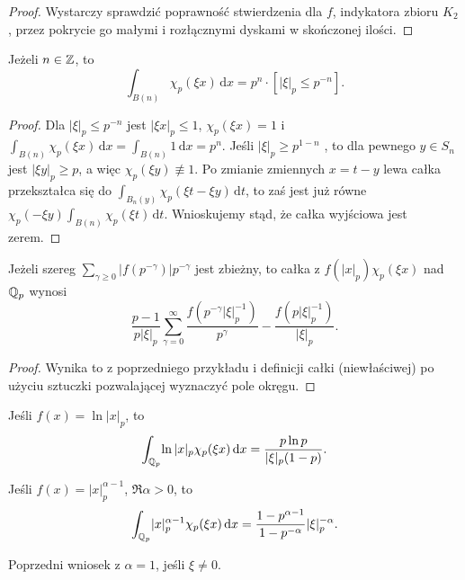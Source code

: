 \begin{proof}
	Wystarczy sprawdzić poprawność stwierdzenia dla $f$, indykatora zbioru $K_2$, przez pokrycie go małymi i rozłącznymi dyskami w skończonej ilości.
\end{proof}

\begin{przyklad}
	Jeżeli  $n \in \mathbb Z$, to
	\[
		\int_{B(n)}\! \chi_p(\xi x) \,\textrm{d}x = p^n \cdot [|\xi|_p \le p^{-n}].
	\]
\end{przyklad}

\begin{proof}
	Dla $|\xi|_p \le p^{-n}$ jest $|\xi x|_p \le 1$, $\chi_p(\xi x) = 1$ i $\int_{B(n)} \chi_p(\xi x)\,\textrm{d}x = \int_{B(n)} 1 \,\textrm{d}x = p^n$.
	Jeśli $|\xi|_p \ge p^{1-n}$	, to dla pewnego $y \in S_n$ jest $|\xi y|_p \ge p$, a więc $\chi_p(\xi y) \not \equiv 1$.
	Po zmianie zmiennych $x = t - y$ lewa całka przekształca się do
	$\int_{B_n(y)} \chi_p(\xi t - \xi y)\,\textrm{d} t$, to zaś jest już równe $\chi_p(- \xi y) \int_{B(n)} \chi_p(\xi t) \,\textrm{d} t$.
	Wnioskujemy stąd, że całka wyjściowa jest zerem.
\end{proof}

\begin{przyklad}
	Jeżeli szereg $\sum_{\gamma \ge 0} |f(p^{-\gamma})| p^{-\gamma}$ jest zbieżny, to całka z $f(|x|_p) \chi_p(\xi x)$ nad $\mathbb Q_p$ wynosi
	\[
		\frac{p-1}{p|\xi|_p} \sum_{\gamma=0}^\infty \frac{f(p^{-\gamma}|\xi|_p^{-1})}{p^\gamma} - \frac{f(p|\xi|_p^{-1})}{|\xi|_p}.
	\]
\end{przyklad}

\begin{proof}
	Wynika to z poprzedniego przykładu i definicji całki (niewłaściwej) po użyciu sztuczki pozwalającej wyznaczyć pole okręgu.
\end{proof}

\begin{wniosek}
	Jeśli $f (x) = \ln |x|_p$, to
	\[
		\int_{\mathbb Q_p} \! \ln |x|_p \chi_p(\xi x) \,\textrm{d}x = \frac{p \ln p}{|\xi|_p (1-p)}.
	\]
\end{wniosek}

\begin{wniosek}
	Jeśli $f (x) = |x|_p^{\alpha - 1}$, $\Re \alpha > 0$, to
	\[
		\int_{\mathbb Q_p} \! |x|_p^{\alpha - 1} \chi_p(\xi x) \,\textrm{d}x = \frac{1-p^{\alpha-1}}{1- p^{-\alpha}} |\xi|_p^{-\alpha}.
	\]
\end{wniosek}

\begin{wniosek}
	Poprzedni wniosek z $\alpha = 1$, jeśli $\xi \neq 0$.
\end{wniosek}

